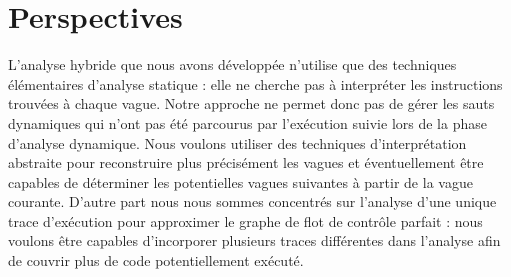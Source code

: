 % 
% 







\section*{Perspectives}
L'analyse hybride que nous avons développée n'utilise que des techniques élémentaires d'analyse statique :
elle ne cherche pas à interpréter les instructions trouvées à chaque vague. 
Notre approche ne permet donc pas de gérer les sauts dynamiques qui n'ont pas été parcourus par l'exécution suivie lors de la phase d'analyse dynamique.
Nous voulons utiliser des techniques d’interprétation abstraite pour reconstruire plus précisément les vagues et éventuellement être capables de déterminer les potentielles vagues suivantes à partir de la vague courante.
D'autre part nous nous sommes concentrés sur l'analyse d'une unique trace d'exécution pour approximer le graphe de flot de contrôle parfait : nous voulons être capables d'incorporer plusieurs traces différentes dans l'analyse afin de couvrir plus de code potentiellement exécuté.

